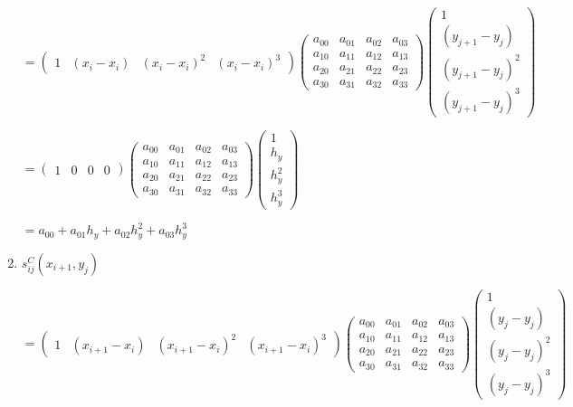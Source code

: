 \documentclass[11pt]{article}
\begin{document}
\begin{enumerate}[label=\textbf{\arabic*)}]
\begin{flushleft}
      $= \begin{pmatrix}
        1 & (x_i - x_i) & (x_i - x_i)^2 & (x_i - x_i)^3
      \end{pmatrix}
      \begin{pmatrix}
        a_{00}  & a_{01} & a_{02} & a_{03} \\
        a_{10}  & a_{11} & a_{12} & a_{13} \\
        a_{20}  & a_{21} & a_{22} & a_{23} \\
        a_{30}  & a_{31} & a_{32} & a_{33}
      \end{pmatrix}
      \begin{pmatrix}
        1  \\
        (y_{j + 1} - y_j) \\
        (y_{j + 1} - y_j)^2  \\
        (y_{j + 1} - y_j)^3
      \end{pmatrix}$


      $= \begin{pmatrix}
        1 & 0 & 0 & 0
      \end{pmatrix}
      \begin{pmatrix}
        a_{00}  & a_{01} & a_{02} & a_{03} \\
        a_{10}  & a_{11} & a_{12} & a_{13} \\
        a_{20}  & a_{21} & a_{22} & a_{23} \\
        a_{30}  & a_{31} & a_{32} & a_{33}
      \end{pmatrix}
      \begin{pmatrix}
        1  \\
        h_y  \\
        h_y^2  \\
        h_y^3
      \end{pmatrix}$

      $= a_{00}  + a_{01}h_y + a_{02}h_y^2 + a_{03}h_y^3 $
    \end{flushleft}

    \item $s_{ij}^C(x_{i + 1}, y_j)$

    \begin{flushleft}

      $= \begin{pmatrix}
        1 & (x_{i + 1} - x_i) & (x_{i + 1} - x_i)^2 & (x_{i + 1} - x_i)^3
      \end{pmatrix}
      \begin{pmatrix}
        a_{00}  & a_{01} & a_{02} & a_{03} \\
        a_{10}  & a_{11} & a_{12} & a_{13} \\
        a_{20}  & a_{21} & a_{22} & a_{23} \\
        a_{30}  & a_{31} & a_{32} & a_{33}
      \end{pmatrix}
      \begin{pmatrix}
        1  \\
        (y_j - y_j) \\
        (y_j - y_j)^2  \\
        (y_j - y_j)^3
      \end{pmatrix}$



\end{flushleft}
\end{enumerate}
\end{document}
